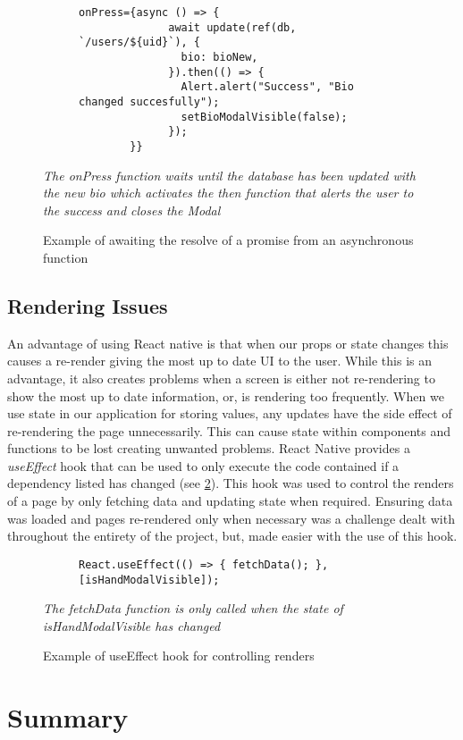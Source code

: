 \begin{figure}[!htbp]
    \centering
    \begin{subfigure}[b]{0.8\textwidth}
        \begin{lstlisting}[language=jsJsx]
        onPress={async () => {
              await update(ref(db, `/users/${uid}`), {
                bio: bioNew,
              }).then(() => {
                Alert.alert("Success", "Bio changed succesfully");
                setBioModalVisible(false);
              });
        }}
        \end{lstlisting}
    \end{subfigure}
\caption{Example of awaiting the resolve of a promise from an asynchronous function}
\small\textit{The onPress function waits until the database has been updated with the new bio which activates the then function that alerts the user to the success and closes the Modal}
\label{fig:asyncAwait}
\end{figure}
\FloatBarrier

\subsection*{Rendering Issues}
An advantage of using React native is that when our props or state changes this causes a re-render giving the most up to date UI to the user. While this is an advantage, it also creates problems when a screen is either not re-rendering to show the most up to date information, or, is rendering too frequently. When we use state in our application for storing values, any updates have the side effect of re-rendering the page unnecessarily. This can cause state within components and functions to be lost creating unwanted problems. React Native provides a \textit{useEffect} hook that can be used to only execute the code contained if a dependency listed has changed (see \ref{fig:useEffect}). This hook was used to control the renders of a page by only fetching data and updating state when required. Ensuring data was loaded and pages re-rendered only when necessary was a challenge dealt with throughout the entirety of the project, but, made easier with the use of this hook.
\begin{figure}[!htbp]
    \centering
    \begin{subfigure}[b]{0.8\textwidth}
        \begin{lstlisting}[language=jsJsx]
        React.useEffect(() => { fetchData(); }, [isHandModalVisible]);
        \end{lstlisting}
    \end{subfigure}
\caption{Example of useEffect hook for controlling renders}
\small\textit{The fetchData function is only called when the state of isHandModalVisible has changed}
\label{fig:useEffect}
\end{figure}
\FloatBarrier
\section{Summary}